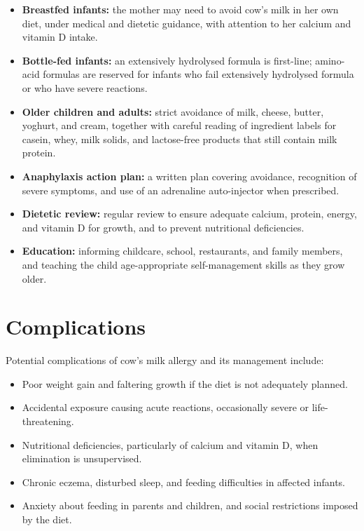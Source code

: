 \begin{itemize}
    \item \textbf{Breastfed infants:} the mother may need to avoid cow's milk in her own diet, under medical and dietetic guidance, with attention to her calcium and vitamin D intake.
    \item \textbf{Bottle-fed infants:} an extensively hydrolysed formula is first-line; amino-acid formulas are reserved for infants who fail extensively hydrolysed formula or who have severe reactions.
    \item \textbf{Older children and adults:} strict avoidance of milk, cheese, butter, yoghurt, and cream, together with careful reading of ingredient labels for casein, whey, milk solids, and lactose-free products that still contain milk protein.
    \item \textbf{Anaphylaxis action plan:} a written plan covering avoidance, recognition of severe symptoms, and use of an adrenaline auto-injector when prescribed.
    \item \textbf{Dietetic review:} regular review to ensure adequate calcium, protein, energy, and vitamin D for growth, and to prevent nutritional deficiencies.
    \item \textbf{Education:} informing childcare, school, restaurants, and family members, and teaching the child age-appropriate self-management skills as they grow older.
\end{itemize}

\section*{Complications}
Potential complications of cow's milk allergy and its management include:

\begin{itemize}
    \item Poor weight gain and faltering growth if the diet is not adequately planned.
    \item Accidental exposure causing acute reactions, occasionally severe or life-threatening.
    \item Nutritional deficiencies, particularly of calcium and vitamin D, when elimination is unsupervised.
    \item Chronic eczema, disturbed sleep, and feeding difficulties in affected infants.
    \item Anxiety about feeding in parents and children, and social restrictions imposed by the diet.
\end{itemize}

